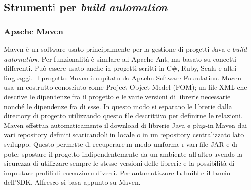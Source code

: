 \subsection{Strumenti per \emph{build automation}}
\subsubsection{Apache Maven}
 Maven è un software usato principalmente per la gestione di progetti Java e \emph{build automation}. Per funzionalità è similare ad Apache Ant, ma basato su concetti differenti. Può essere usato anche in progetti scritti in C\#, Ruby, Scala e altri linguaggi. Il progetto Maven è ospitato da Apache Software Foundation.
Maven usa un costrutto conosciuto come Project Object Model (POM); un file XML che descrive le dipendenze fra il progetto e le varie versioni di librerie necessarie nonché le dipendenze fra di esse. In questo modo si separano le librerie dalla directory di progetto utilizzando questo file descrittivo per definirne le relazioni.
Maven effettua automaticamente il download di librerie Java e plug-in Maven dai vari repository definiti scaricandoli in locale o in un repository centralizzato lato sviluppo. Questo permette di recuperare in modo uniforme i vari file JAR e di poter spostare il progetto indipendentemente da un ambiente all'altro avendo la sicurezza di utilizzare sempre le stesse versioni delle librerie e la possibilità di impostare profili di esecuzione diversi.
Per automatizzare la build e il lancio dell'SDK, Alfresco si basa appunto su Maven.
